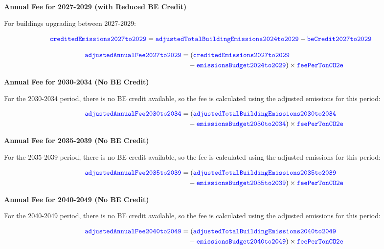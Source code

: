 \documentclass{article}
\newcommand{\code}[1]{\textcolor{blue}{\texttt{#1}}}
\begin{document}
\textbf{Annual Fee for 2027-2029 (with Reduced BE Credit)}

For buildings upgrading between 2027-2029:

\begin{align}
\code{creditedEmissions2027to2029} &= \code{adjustedTotalBuildingEmissions2024to2029} - \code{beCredit2027to2029}
\end{align}

\begin{align}
\code{adjustedAnnualFee2027to2029} &= (\code{creditedEmissions2027to2029} \nonumber\\
&\quad - \code{emissionsBudget2024to2029}) \times \code{feePerTonCO2e}
\end{align}

\textbf{Annual Fee for 2030-2034 (No BE Credit)}

For the 2030-2034 period, there is no BE credit available, so the fee is calculated using the adjusted emissions for this period:

\begin{align}
\code{adjustedAnnualFee2030to2034} &= (\code{adjustedTotalBuildingEmissions2030to2034} \nonumber\\
&\quad - \code{emissionsBudget2030to2034}) \times \code{feePerTonCO2e}
\end{align}

\textbf{Annual Fee for 2035-2039 (No BE Credit)}

For the 2035-2039 period, there is no BE credit available, so the fee is calculated using the adjusted emissions for this period:

\begin{align}
\code{adjustedAnnualFee2035to2039} &= (\code{adjustedTotalBuildingEmissions2035to2039} \nonumber\\
&\quad - \code{emissionsBudget2035to2039}) \times \code{feePerTonCO2e}
\end{align}

\textbf{Annual Fee for 2040-2049 (No BE Credit)}

For the 2040-2049 period, there is no BE credit available, so the fee is calculated using the adjusted emissions for this period:

\begin{align}
\code{adjustedAnnualFee2040to2049} &= (\code{adjustedTotalBuildingEmissions2040to2049} \nonumber\\
&\quad - \code{emissionsBudget2040to2049}) \times \code{feePerTonCO2e}
\end{align}
\end{document}
